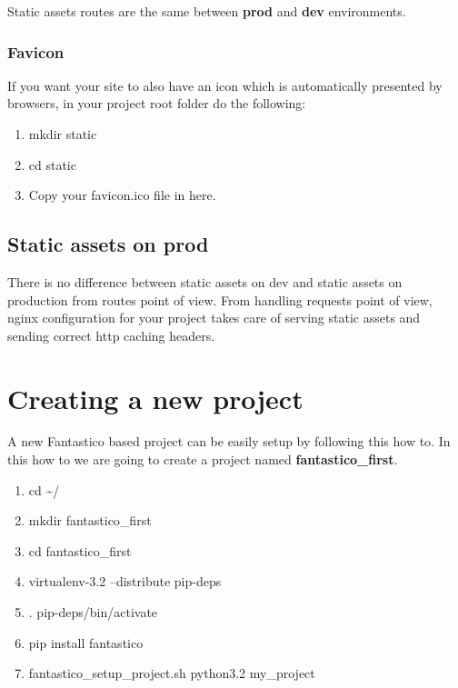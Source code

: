 \documentclass[letterpaper,10pt,english]{sphinxmanual}
\begin{document}
Static assets routes are the same between \textbf{prod} and \textbf{dev} environments.


\subsubsection{Favicon}
\label{how_to/static_assets:favicon}
If you want your site to also have an icon which is automatically presented by browsers, in your project root folder
do the following:
\begin{enumerate}
\item {} 
mkdir static

\item {} 
cd static

\item {} 
Copy your favicon.ico file in here.

\end{enumerate}


\subsection{Static assets on prod}
\label{how_to/static_assets:static-assets-on-prod}
There is no difference between static assets on dev and static assets on production from routes point of view.
From handling requests point of view, nginx configuration for your project takes care of serving static assets
and sending correct http caching headers.


\section{Creating a new project}
\label{how_to/new_project_how_to:creating-a-new-project}\label{how_to/new_project_how_to::doc}
A new Fantastico based project can be easily setup by following this how to. In this how to we are going to create
a project named \textbf{fantastico\_first}.
\begin{enumerate}
\item {} 
cd \textasciitilde{}/

\item {} 
mkdir fantastico\_first

\item {} 
cd fantastico\_first

\item {} 
virtualenv-3.2 --distribute pip-deps

\item {} 
. pip-deps/bin/activate

\item {} 
pip install fantastico

\item {} 
fantastico\_setup\_project.sh python3.2 my\_project

\end{enumerate}
\end{document}
